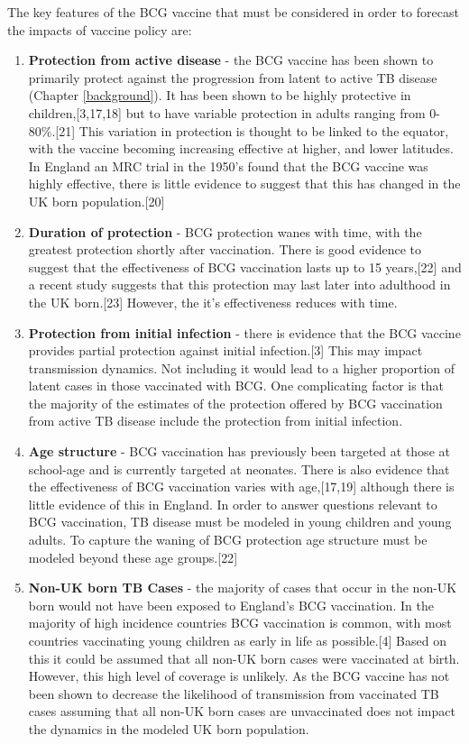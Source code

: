 \documentclass[11pt,twoside]{bristolthesis}
\begin{document}
  The key features of the BCG vaccine that must be considered in order to forecast the impacts of vaccine policy are:
  \begin{enumerate}
  \def\labelenumi{\arabic{enumi}.}
  \item
    \textbf{Protection from active disease} - the BCG vaccine has been shown to primarily protect against the progression from latent to active TB disease (Chapter \ref{background}). It has been shown to be highly protective in children,{[}3,17,18{]} but to have variable protection in adults ranging from 0-80\%.{[}21{]} This variation in protection is thought to be linked to the equator, with the vaccine becoming increasing effective at higher, and lower latitudes. In England an MRC trial in the 1950's found that the BCG vaccine was highly effective, there is little evidence to suggest that this has changed in the UK born population.{[}20{]}
  \item
    \textbf{Duration of protection} - BCG protection wanes with time, with the greatest protection shortly after vaccination. There is good evidence to suggest that the effectiveness of BCG vaccination lasts up to 15 years,{[}22{]} and a recent study suggests that this protection may last later into adulthood in the UK born.{[}23{]} However, the it's effectiveness reduces with time.
  \item
    \textbf{Protection from initial infection} - there is evidence that the BCG vaccine provides partial protection against initial infection.{[}3{]} This may impact transmission dynamics. Not including it would lead to a higher proportion of latent cases in those vaccinated with BCG. One complicating factor is that the majority of the estimates of the protection offered by BCG vaccination from active TB disease include the protection from initial infection.
  \item
    \textbf{Age structure} - BCG vaccination has previously been targeted at those at school-age and is currently targeted at neonates. There is also evidence that the effectiveness of BCG vaccination varies with age,{[}17,19{]} although there is little evidence of this in England. In order to answer questions relevant to BCG vaccination, TB disease must be modeled in young children and young adults. To capture the waning of BCG protection age structure must be modeled beyond these age groups.{[}22{]}
  \item
    \textbf{Non-UK born TB Cases} - the majority of cases that occur in the non-UK born would not have been exposed to England's BCG vaccination. In the majority of high incidence countries BCG vaccination is common, with most countries vaccinating young children as early in life as possible.{[}4{]} Based on this it could be assumed that all non-UK born cases were vaccinated at birth. However, this high level of coverage is unlikely. As the BCG vaccine has not been shown to decrease the likelihood of transmission from vaccinated TB cases assuming that all non-UK born cases are unvaccinated does not impact the dynamics in the modeled UK born population.

\end{enumerate}
\end{document}
